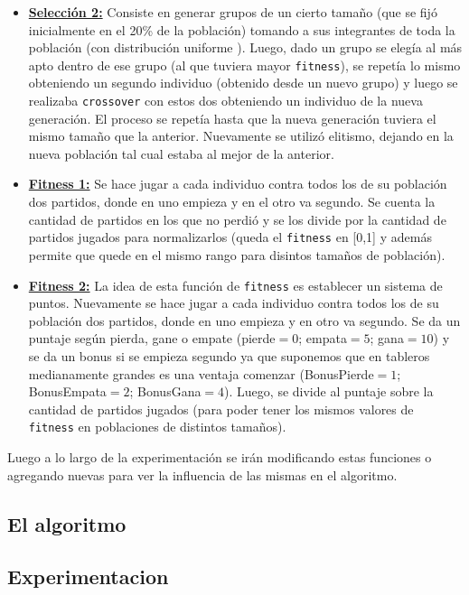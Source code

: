 \documentclass[A4paper,oneside,fleqn,11pt]{article}
\theoremstyle{definition}
\begin{document}
\begin{itemize}
\item \textbf{\underline{Selección 2:}} Consiste en generar grupos de un cierto tamaño (que se fijó inicialmente en el 20\% de la población) tomando a sus integrantes de toda la población (con distribución uniforme%
). Luego, dado un grupo se elegía al más apto dentro de ese grupo (al que tuviera mayor \texttt{fitness}), se repetía lo mismo obteniendo un segundo individuo (obtenido desde un nuevo grupo) y luego se realizaba \texttt{crossover} con estos dos obteniendo un individuo de la nueva generación. El proceso se repetía hasta que la nueva generación tuviera el mismo tamaño que la anterior. Nuevamente se utilizó elitismo, dejando en la nueva población tal cual estaba al mejor de la anterior.

\item \textbf{\underline{Fitness 1:}} Se hace jugar a cada individuo contra todos los de su población dos partidos, donde en uno empieza y en el otro va segundo. Se cuenta la cantidad de partidos en los que no perdió y se los divide por la cantidad de partidos jugados para normalizarlos (queda el \texttt{fitness} en [0,1] y además permite que quede en el mismo rango para disintos tamaños de población).


\item \textbf{\underline{Fitness 2:}} La idea de esta función de \texttt{fitness} es establecer un sistema de puntos. Nuevamente se hace jugar a cada individuo contra todos los de su población dos partidos, donde en uno empieza y en otro va segundo. Se da un puntaje según pierda, gane o empate (pierde$=0$; empata$=5$; gana$=10$) y se da un bonus si se empieza segundo ya que suponemos que en tableros medianamente grandes es una ventaja comenzar (BonusPierde$=1$; BonusEmpata$=2$; BonusGana$=4$). Luego, se divide al puntaje sobre la cantidad de partidos jugados (para poder tener los mismos valores de \texttt{fitness} en poblaciones de distintos tamaños).
\end{itemize}

Luego a lo largo de la experimentación se irán modificando estas funciones o agregando nuevas para ver la influencia de las mismas en el algoritmo.

\subsection{El algoritmo}



\subsection{Experimentacion}
\end{document}
